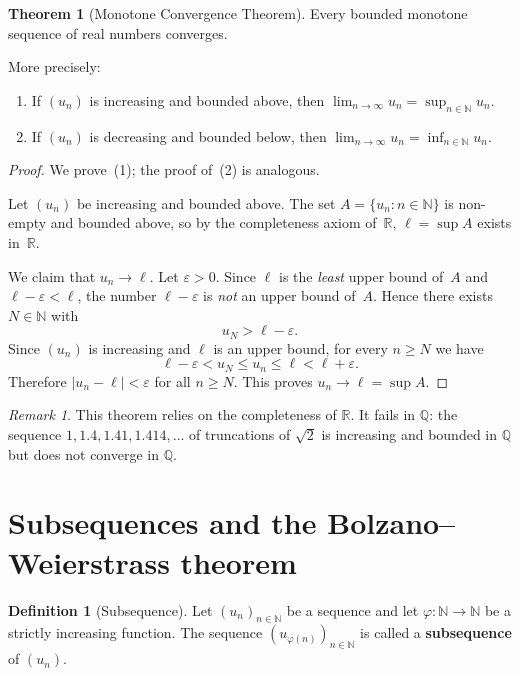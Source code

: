 \documentclass[12pt,a4paper,openany]{book}
\newcommand{\N}{\mathbb{N}}
\newcommand{\Q}{\mathbb{Q}}
\newcommand{\R}{\mathbb{R}}
\newcommand{\eps}{\varepsilon}
\newcommand{\abs}[1]{\left\lvert #1 \right\rvert}
\theoremstyle{definition}
\newtheorem{definition}{Definition}[chapter]
\newtheorem{theorem}{Theorem}[chapter]
\theoremstyle{remark}
\newtheorem{remark}{Remark}[chapter]
\begin{document}
\begin{theorem}[Monotone Convergence Theorem]\label{thm:MCT}
Every bounded monotone sequence of real numbers converges.

More precisely:
\begin{enumerate}
\item If $(u_n)$ is increasing and bounded above, then
      $\displaystyle\lim_{n\to\infty} u_n = \sup_{n\in\N} u_n$.
\item If $(u_n)$ is decreasing and bounded below, then
      $\displaystyle\lim_{n\to\infty} u_n = \inf_{n\in\N} u_n$.
\end{enumerate}
\end{theorem}

\begin{proof}
We prove~(1); the proof of~(2) is analogous.

Let $(u_n)$ be increasing and bounded above. The set
$A = \{u_n : n \in \N\}$ is non-empty and bounded above, so by the
completeness axiom of~$\R$, $\ell = \sup A$ exists in~$\R$.

We claim that $u_n \to \ell$. Let $\eps > 0$. Since $\ell$ is the
\emph{least} upper bound of~$A$ and $\ell - \eps < \ell$, the number
$\ell - \eps$ is \emph{not} an upper bound of~$A$. Hence there exists
$N \in \N$ with
\[
   u_N > \ell - \eps.
\]
Since $(u_n)$ is increasing and $\ell$ is an upper bound, for every
$n \geq N$ we have
\[
   \ell - \eps < u_N \leq u_n \leq \ell < \ell + \eps.
\]
Therefore $\abs{u_n - \ell} < \eps$ for all $n \geq N$. This proves
$u_n \to \ell = \sup A$.
\end{proof}

\begin{remark}
This theorem relies on the completeness of $\R$. It fails in $\Q$: the
sequence $1, 1.4, 1.41, 1.414, \ldots$ of truncations of $\sqrt{2}$ is
increasing and bounded in $\Q$ but does not converge in $\Q$.
\end{remark}

\section{Subsequences and the Bolzano--Weierstrass theorem}
\label{sec:subsequences}

\begin{definition}[Subsequence]\label{def:subsequence}
Let $(u_n)_{n\in\N}$ be a sequence and let $\varphi\colon \N \to \N$ be a
strictly increasing function. The sequence $(u_{\varphi(n)})_{n\in\N}$ is
called a \textbf{subsequence} of $(u_n)$.
\end{definition}
\end{document}
